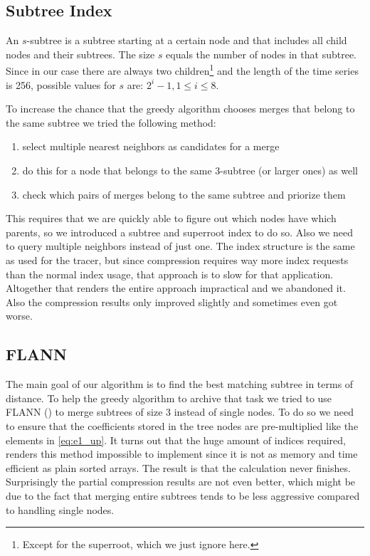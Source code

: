 \subsection{Subtree Index}
\label{ssec:algorithm:fail:stindex}

\begin{definition}[$s$-subtree]
    An $s$-subtree is a subtree starting at a certain node and that includes all child nodes and their subtrees. The size $s$ equals the number of nodes in that subtree. Since in our case there are always two children\footnote{Except for the superroot, which we just ignore here.} and the length of the time series is \num{256}, possible values for $s$ are: $2^i - 1, 1 \leq i \leq 8$.
\end{definition}

To increase the chance that the greedy algorithm chooses merges that belong to the same subtree we tried the following method:

\begin{enumerate}
    \item select multiple nearest neighbors as candidates for a merge
    \item do this for a node that belongs to the same \num{3}-subtree (or larger ones) as well
    \item check which pairs of merges belong to the same subtree and priorize them
\end{enumerate}

This requires that we are quickly able to figure out which nodes have which parents, so we introduced a subtree and superroot index to do so. Also we need to query multiple neighbors instead of just one. The index structure is the same as used for the tracer, but since compression requires way more index requests than the normal index usage, that approach is to slow for that application. Altogether that renders the entire approach impractical and we abandoned it. Also the compression results only improved slightly and sometimes even got worse.


\subsection{FLANN}
\label{ssec:algorithm:fail:flann}

The main goal of our algorithm is to find the best matching subtree in terms of distance. To help the greedy algorithm to archive that task we tried to use FLANN (\cite{FLANN}) to merge subtrees of size \num{3} instead of single nodes. To do so we need to ensure that the coefficients stored in the tree nodes are pre-multiplied like the elements in \autoref{eq:e1_up}. It turns out that the huge amount of indices required, renders this method impossible to implement since it is not as memory and time efficient as plain sorted arrays. The result is that the calculation never finishes. Surprisingly the partial compression results are not even better, which might be due to the fact that merging entire subtrees tends to be less aggressive compared to handling single nodes.


